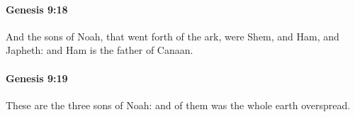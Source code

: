 		\paragraph{Genesis 9:18} %
			\label{GENESIS-9-18}

			And the sons of Noah, that went forth of the ark, were Shem, and Ham, and Japheth: and Ham is the father of Canaan.


		\paragraph{Genesis 9:19} %
			\label{GENESIS-9-19}

			These are the three sons of Noah: and of them was the whole earth overspread.


